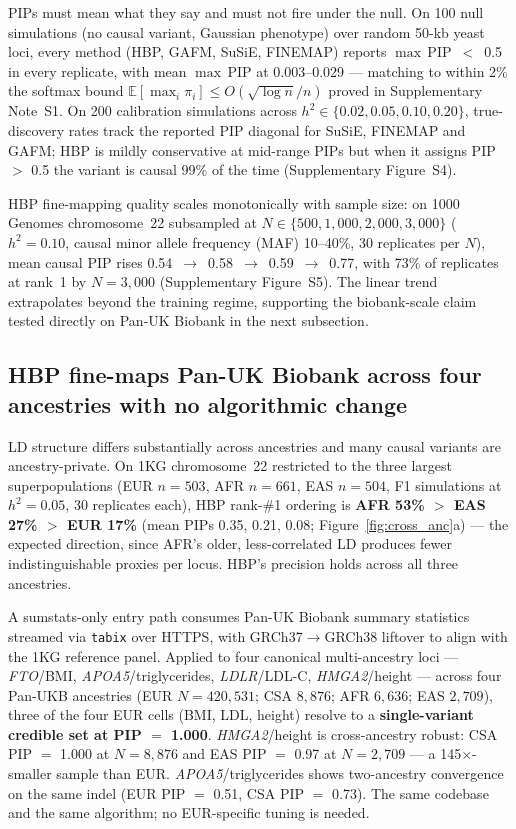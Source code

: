 PIPs must mean what they say and must not fire under the null. On
100 null simulations (no causal variant, Gaussian phenotype) over
random 50-kb yeast loci, every method (HBP, GAFM, SuSiE, FINEMAP)
reports $\max$\,PIP~$<$~0.5 in every replicate, with mean
$\max$\,PIP at 0.003--0.029 --- matching to within 2\% the
softmax bound $\mathbb{E}[\max_i \pi_i] \leq
O(\sqrt{\log n}/n)$ proved in Supplementary Note~S1. On 200
calibration simulations across $h^2 \in \{0.02, 0.05, 0.10, 0.20\}$,
true-discovery rates track the reported PIP diagonal for SuSiE,
FINEMAP and GAFM; HBP is mildly conservative at mid-range PIPs but
when it assigns PIP $>$ 0.5 the variant is causal 99\% of the
time (Supplementary Figure~S4).

HBP fine-mapping quality scales monotonically with sample size:
on 1000 Genomes chromosome~22 subsampled at
$N \in \{500, 1{,}000, 2{,}000, 3{,}000\}$ ($h^2 = 0.10$, causal
minor allele frequency (MAF) 10--40\%, 30 replicates per $N$),
mean causal PIP rises
0.54~$\rightarrow$~0.58~$\rightarrow$~0.59~$\rightarrow$~0.77, with
73\% of replicates at rank~1 by $N = 3{,}000$ (Supplementary
Figure~S5). The linear trend extrapolates beyond the training
regime, supporting the biobank-scale claim tested directly on
Pan-UK Biobank in the next subsection.

\subsection*{HBP fine-maps Pan-UK Biobank across four ancestries with no algorithmic change}\label{sec:cross_anc}

LD structure differs substantially across ancestries and many causal
variants are ancestry-private. On 1KG chromosome~22 restricted to
the three largest superpopulations (EUR $n=503$, AFR $n=661$, EAS
$n=504$, F1 simulations at $h^2 = 0.05$, 30 replicates each), HBP
rank-\#1 ordering is \textbf{AFR 53\% $>$ EAS 27\% $>$ EUR 17\%}
(mean PIPs 0.35, 0.21, 0.08; Figure~\ref{fig:cross_anc}a) --- the
expected direction, since AFR's older, less-correlated LD produces
fewer indistinguishable proxies per locus. HBP's precision holds
across all three ancestries.

A sumstats-only entry path consumes Pan-UK
Biobank\cite{karczewski2024pan,bycroft2018uk} summary statistics
streamed via \texttt{tabix}\cite{li2011tabix} over HTTPS, with
GRCh37$\to$GRCh38 liftover to align with the 1KG reference panel.
Applied to four canonical multi-ancestry loci ---
\emph{FTO}/BMI\cite{frayling2007common},
\emph{APOA5}/triglycerides\cite{do2013common},
\emph{LDLR}/LDL-C\cite{teslovich2010biological},
\emph{HMGA2}/height\cite{weedon2008genome,yengo2022saturated} ---
across four Pan-UKB ancestries (EUR $N=420{,}531$; CSA $8{,}876$;
AFR $6{,}636$; EAS $2{,}709$), three of the four EUR cells (BMI,
LDL, height) resolve to a \textbf{single-variant credible set at
PIP $=$ 1.000}. \emph{HMGA2}/height is cross-ancestry robust: CSA
PIP $=$ 1.000 at $N=8{,}876$ and EAS PIP $=$ 0.97 at $N=2{,}709$ ---
a 145$\times$-smaller sample than EUR. \emph{APOA5}/triglycerides
shows two-ancestry convergence on the same indel
(EUR PIP $=$ 0.51, CSA PIP $=$ 0.73). The same codebase and the
same algorithm; no EUR-specific tuning is needed.

